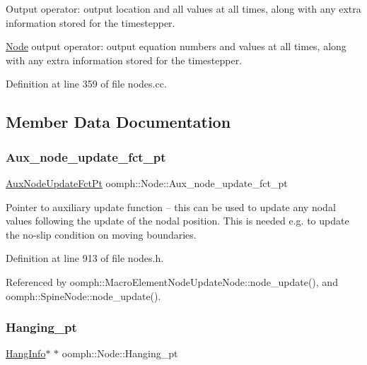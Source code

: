 Output operator\+: output location and all values at all times, along with any extra information stored for the timestepper.

\hyperlink{classoomph_1_1Node}{Node} output operator\+: output equation numbers and values at all times, along with any extra information stored for the timestepper. 

Definition at line 359 of file nodes.\+cc.



\subsection{Member Data Documentation}
\mbox{\label{classoomph_1_1Node_a8bfd206ba303b6d446f59974719b24b6}} 
\subsubsection{\texorpdfstring{Aux\+\_\+node\+\_\+update\+\_\+fct\+\_\+pt}{Aux\_node\_update\_fct\_pt}}
{\footnotesize\ttfamily \hyperlink{classoomph_1_1Node_afcc4cc3e1e48964baf23fa44c98293a9}{Aux\+Node\+Update\+Fct\+Pt} oomph\+::\+Node\+::\+Aux\+\_\+node\+\_\+update\+\_\+fct\+\_\+pt\hspace{0.3cm}{\ttfamily [protected]}}



Pointer to auxiliary update function -- this can be used to update any nodal values following the update of the nodal position. This is needed e.\+g. to update the no-\/slip condition on moving boundaries. 



Definition at line 913 of file nodes.\+h.



Referenced by oomph\+::\+Macro\+Element\+Node\+Update\+Node\+::node\+\_\+update(), and oomph\+::\+Spine\+Node\+::node\+\_\+update().

\mbox{\label{classoomph_1_1Node_a4efe1b8b72dd6eb748dd21109eb1bf54}} 
\subsubsection{\texorpdfstring{Hanging\+\_\+pt}{Hanging\_pt}}
{\footnotesize\ttfamily \hyperlink{classoomph_1_1HangInfo}{Hang\+Info}$\ast$ $\ast$ oomph\+::\+Node\+::\+Hanging\+\_\+pt\hspace{0.3cm}{\ttfamily [protected]}}



